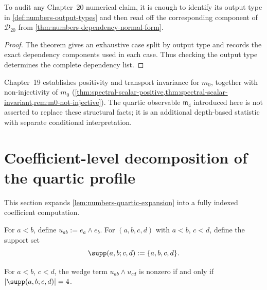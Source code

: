\begin{corollary}
\label{cor:numbers-auditability}
To audit any Chapter~20 numerical claim, it is enough to identify its output
type in \cref{def:numbers-output-types} and then read off the corresponding
component of \(\mathcal D_{20}\) from
\cref{thm:numbers-dependency-normal-form}.
\end{corollary}

\begin{proof}
The theorem gives an exhaustive case split by output type and records the
exact dependency components used in each case.  Thus checking the output type
determines the complete dependency list.
\end{proof}

\begin{remark}
\label{rem:numbers-scope-ch19}
Chapter~19 establishes positivity and transport invariance for
\(m_0\), together with non-injectivity of \(m_0\)
(\cref{thm:spectral-scalar-positive,thm:spectral-scalar-invariant,rem:m0-not-injective}).
The quartic observable \(\mathfrak m_4\) introduced here is not asserted
to replace these structural facts;
it is an additional depth-based statistic with separate conditional
interpretation.
\end{remark}

\section{Coefficient-level decomposition of the quartic profile}
\label{sec:numbers-coeff-decomposition}

This section expands \cref{lem:numbers-quartic-expansion} into a fully
indexed coefficient computation.

\begin{definition}
\label{def:numbers-support}
For \(a<b\), define
\(
  u_{ab}:=e_a\wedge e_b
\).
For \((a,b,c,d)\) with \(a<b\), \(c<d\), define the support set
\[
  \supp(a,b;c,d):=\{a,b,c,d\}.
\]
\end{definition}

\begin{lemma}
\label{lem:numbers-support-criterion}
For \(a<b\), \(c<d\), the wedge term
\(u_{ab}\wedge u_{cd}\) is nonzero if and only if
\(|\supp(a,b;c,d)|=4\).
\end{lemma}

